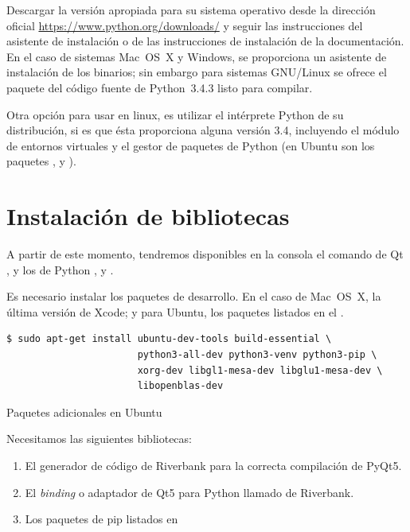 Descargar la versión apropiada para su sistema operativo desde la dirección oficial \url{https://www.python.org/downloads/} y seguir las instrucciones del asistente de instalación o de las instrucciones de instalación de la documentación. En el caso de sistemas Mac~OS~X y Windows, se proporciona un asistente de instalación de los binarios; sin embargo para sistemas GNU/Linux se ofrece el paquete del código fuente de Python~3.4.3 listo para compilar.

Otra opción para usar en linux, es utilizar el intérprete Python de su distribución, si es que ésta proporciona alguna versión 3.4, incluyendo el módulo de entornos virtuales  y el gestor de paquetes de Python  (en Ubuntu son los paquetes ,  y ).

\section{Instalación de bibliotecas}

A partir de este momento, tendremos disponibles en la consola el comando de Qt , y los de Python ,  y .

Es necesario instalar los paquetes de desarrollo. En el caso de Mac~OS~X, la última versión de Xcode; y para Ubuntu, los paquetes listados en el .

\begin{listing}[htbp]
\begin{verbatim}
$ sudo apt-get install ubuntu-dev-tools build-essential \
                       python3-all-dev python3-venv python3-pip \
                       xorg-dev libgl1-mesa-dev libglu1-mesa-dev \
                       libopenblas-dev
\end{verbatim}
\caption{Paquetes adicionales en Ubuntu}
\label{lst:ubuntu-apt-get}
\end{listing}

\FloatBarrier

Necesitamos las siguientes bibliotecas:
\begin{enumerate}
\item El generador de código  de Riverbank para la correcta compilación de PyQt5.
\item El \emph{binding} o adaptador de Qt5 para Python llamado  de Riverbank.
\item Los paquetes de pip listados en 
\end{enumerate}

